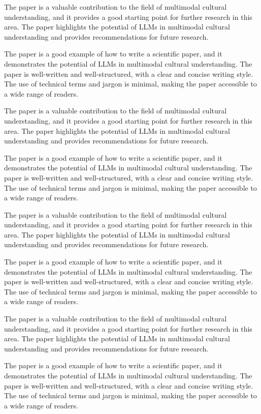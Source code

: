         The paper is a valuable contribution to the field of multimodal cultural understanding, and it provides a good starting point for further research in this area. The paper highlights the potential of LLMs in multimodal cultural understanding and provides recommendations for future research. 

        The paper is a good example of how to write a scientific paper, and it demonstrates the potential of LLMs in multimodal cultural understanding. The paper is well-written and well-structured, with a clear and concise writing style. The use of technical terms and jargon is minimal, making the paper accessible to a wide range of readers. 

        The paper is a valuable contribution to the field of multimodal cultural understanding, and it provides a good starting point for further research in this area. The paper highlights the potential of LLMs in multimodal cultural understanding and provides recommendations for future research. 

        The paper is a good example of how to write a scientific paper, and it demonstrates the potential of LLMs in multimodal cultural understanding. The paper is well-written and well-structured, with a clear and concise writing style. The use of technical terms and jargon is minimal, making the paper accessible to a wide range of readers. 

        The paper is a valuable contribution to the field of multimodal cultural understanding, and it provides a good starting point for further research in this area. The paper highlights the potential of LLMs in multimodal cultural understanding and provides recommendations for future research. 

        The paper is a good example of how to write a scientific paper, and it demonstrates the potential of LLMs in multimodal cultural understanding. The paper is well-written and well-structured, with a clear and concise writing style. The use of technical terms and jargon is minimal, making the paper accessible to a wide range of readers. 

        The paper is a valuable contribution to the field of multimodal cultural understanding, and it provides a good starting point for further research in this area. The paper highlights the potential of LLMs in multimodal cultural understanding and provides recommendations for future research. 

        The paper is a good example of how to write a scientific paper, and it demonstrates the potential of LLMs in multimodal cultural understanding. The paper is well-written and well-structured, with a clear and concise writing style. The use of technical terms and jargon is minimal, making the paper accessible to a wide range of readers. 

